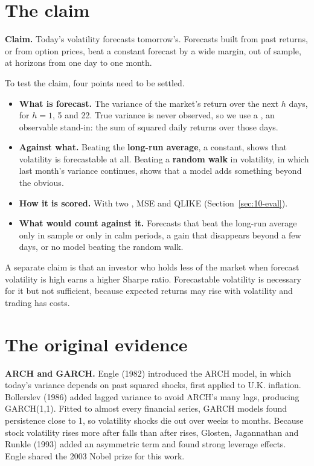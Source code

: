 \section{The claim}
\label{sec:10-claim}

\begin{callout}
\textbf{Claim.} Today's volatility forecasts tomorrow's. Forecasts built from past returns, or from option prices, beat a constant forecast by a wide margin, out of sample, at horizons from one day to one month.
\end{callout}

To test the claim, four points need to be settled.

\begin{itemize}
  \item \textbf{What is forecast.} The variance of the market's return over the next $h$ days, for $h = 1$, 5 and 22. True variance is never observed, so we use a , an observable stand-in: the sum of squared daily returns over those days.
  \item \textbf{Against what.} Beating the \textbf{long-run average}, a constant, shows that volatility is forecastable at all. Beating a \textbf{random walk} in volatility, in which last month's variance continues, shows that a model adds something beyond the obvious.
  \item \textbf{How it is scored.} With two , MSE and QLIKE (Section~\ref{sec:10-eval}).
  \item \textbf{What would count against it.} Forecasts that beat the long-run average only in sample or only in calm periods, a gain that disappears beyond a few days, or no model beating the random walk.
\end{itemize}

A separate claim is that an investor who holds less of the market when forecast volatility is high earns a higher Sharpe ratio. Forecastable volatility is necessary for it but not sufficient, because expected returns may rise with volatility and trading has costs.

\section{The original evidence}
\label{sec:10-evidence}

\textbf{ARCH and GARCH.} Engle (1982) introduced the ARCH model, in which today's variance depends on past squared shocks, first applied to U.K. inflation. Bollerslev (1986) added lagged variance to avoid ARCH's many lags, producing GARCH(1,1). Fitted to almost every financial series, GARCH models found persistence close to 1, so volatility shocks die out over weeks to months. Because stock volatility rises more after falls than after rises, Glosten, Jagannathan and Runkle (1993) added an asymmetric term and found strong leverage effects. Engle shared the 2003 Nobel prize for this work.

